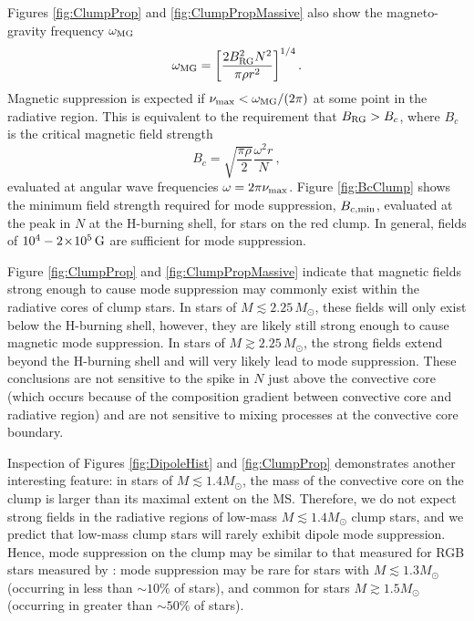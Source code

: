 Figures \ref{fig:ClumpProp} and \ref{fig:ClumpPropMassive} also show the magneto-gravity frequency $\omega_{\rm MG}$ \citep{Fuller_2015}
\begin{equation}
\label{eqn:omegaMG}
\omega_{\rm MG} = \bigg[ \frac{ 2 B_{\rm RG}^2 N^2}{\pi \rho r^2} \bigg]^{1/4} \, .
\end{equation}
Magnetic suppression is expected if $\nu_{\rm max} < \omega_{\rm MG}/(2 \pi)$ at some point in the radiative region. This is equivalent to the requirement that $B_{\rm RG} > B_c$, where $B_c$ is the critical magnetic field strength
\begin{equation}
\label{eqn:Bc}
B_c = \sqrt{ \frac{ \pi \rho}{2} } \frac{\omega^2 r}{N} \, ,
\end{equation}
evaluated at angular wave frequencies $\omega = 2 \pi \nu_{\rm max}$. Figure \ref{fig:BcClump} shows the minimum field strength required for mode suppression, $B_{c,{\rm min}}$, evaluated at the peak in $N$ at the H-burning shell, for stars on the red clump. In general, fields of $10^4-2 \! \times \! 10^5 \, {\rm G}$ are sufficient for mode suppression. 

Figure \ref{fig:ClumpProp} and \ref{fig:ClumpPropMassive} indicate that magnetic fields strong enough to cause mode suppression may commonly exist within the radiative cores of clump stars. In stars of $M \lesssim 2.25 \, M_\odot$, these fields will only exist below the H-burning shell, however, they are likely still strong enough to cause magnetic mode suppression. In stars of $M \gtrsim 2.25 \, M_\odot$, the strong fields extend beyond the H-burning shell and will very likely lead to mode suppression. These conclusions are not sensitive to the spike in $N$ just above the convective core (which occurs because of the composition gradient between convective core and radiative region) and are not sensitive to mixing processes at the convective core boundary. 

Inspection of Figures \ref{fig:DipoleHist} and \ref{fig:ClumpProp} demonstrates another interesting feature: in stars of $M \lesssim 1.4 M_\odot$, the mass of the convective core on the clump is larger than its maximal extent on the MS. Therefore, we do not expect strong fields in the radiative regions of low-mass $M \lesssim 1.4 M_\odot$ clump stars, and we predict that low-mass clump stars will rarely exhibit dipole mode suppression. Hence, mode suppression on the clump may be similar to that measured for RGB stars measured by \cite{Stello_2016}: mode suppression may be rare for stars with $M \lesssim 1.3 M_\odot$ (occurring in less than $\sim \! 10 \%$ of stars), and common for stars $M \gtrsim 1.5 M_\odot$ (occurring in greater than $\sim \! 50 \%$ of stars). 


    
  
  
  
  
  